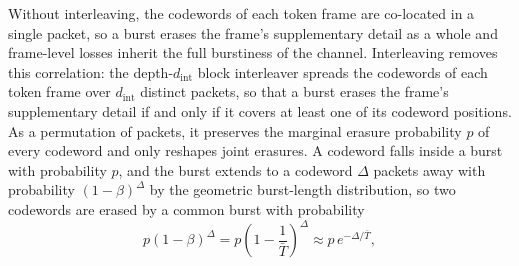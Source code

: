 \documentclass[lettersize,journal]{IEEEtran}
\begin{document}
Without interleaving, the codewords of each token frame are co-located in a single packet, so a burst erases the frame's supplementary detail as a whole and frame-level losses inherit the full burstiness of the channel. Interleaving removes this correlation: the depth-$d_{\mathrm{int}}$ block interleaver spreads the codewords of each token frame over $d_{\mathrm{int}}$ distinct packets, so that a burst erases the frame's supplementary detail if and only if it covers at least one of its codeword positions. As a permutation of packets, it preserves the marginal erasure probability $p$ of every codeword and only reshapes joint erasures. A codeword falls inside a burst with probability $p$, and the burst extends to a codeword $\Delta$ packets away with probability $(1-\beta)^{\Delta}$ by the geometric burst-length distribution, so two codewords are erased by a common burst with probability
\begin{equation}
p(1-\beta)^{\Delta}=p\left(1-\frac{1}{\bar{T}}\right)^{\Delta}\approx p\,e^{-\Delta/\bar{T}},
\label{eq:joint}
\end{equation}
\end{document}
